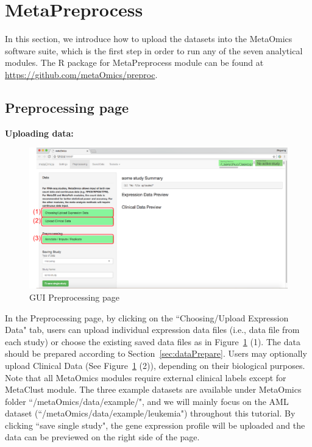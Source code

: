 

\section{MetaPreprocess}

In this section, we introduce how to upload the datasets into the MetaOmics software suite,
which is the first step in order to run any of the seven analytical modules.
The R package for MetaPreprocess module can be found at \url{https://github.com/metaOmics/preproc}.

\subsection{Preprocessing page}
\label{sec:procedure}

\begin{steps}
\item \textbf{Uploading data:}

\begin{figure}[!htbp]
\begin{center}
\includegraphics[scale=1]{./figure/preprocessing/GUIpreprocessing}
\caption{GUI Preprocessing page}
\label{fig:GUIpreprocessing}
\end{center}
\end{figure}

In the Preprocessing page,
by clicking on the ``Choosing/Upload Expression Data" tab,
users can upload individual expression data files (i.e., data file from each study) 
or choose the existing saved data files as in Figure~\ref{fig:GUIpreprocessing} {\color{red} (1)}.
The data should be prepared according to Section~\ref{sec:dataPrepare}.
Users may optionally upload Clinical Data (See Figure~\ref{fig:GUIpreprocessing} {\color{red} (2)}), 
depending on their biological purposes.
Note that all MetaOmics modules require external clinical labels except for MetaClust module.
The three example datasets are available under MetaOmics folder ``/metaOmics/data/example/",
and we will mainly focus on the AML dataset (``/metaOmics/data/example/leukemia") throughout this tutorial.
By clicking ``save single study", the gene expression profile will be uploaded and the data can be previewed on the right side of the page.



\end{steps}
